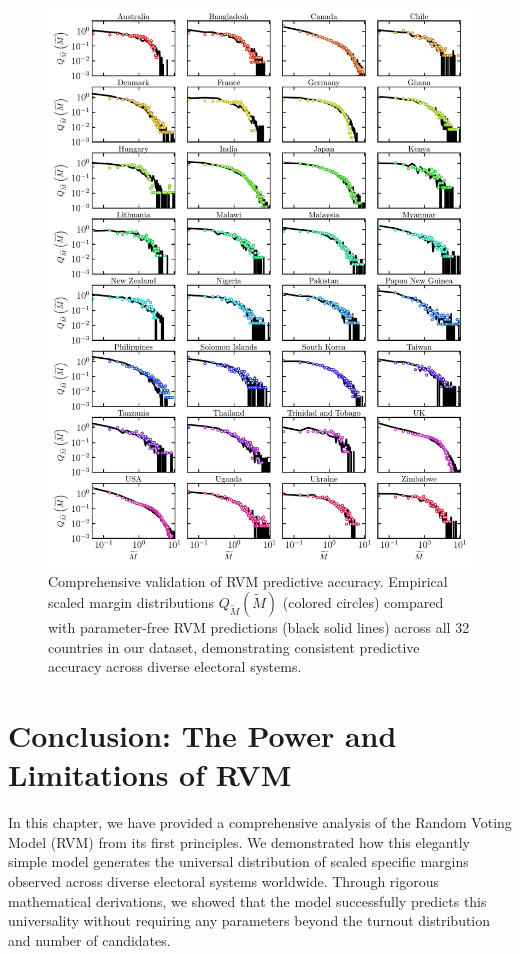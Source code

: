 \begin{figure}[H]
    \includegraphics[width=\textwidth]{chapters/chapter5/scale_margin_distribution_32_countries.pdf}
    \caption{Comprehensive validation of RVM predictive accuracy. Empirical scaled margin distributions $Q_{\widetilde{M}}(\widetilde{M})$ (colored circles) compared with parameter-free RVM predictions (black solid lines) across all 32 countries in our dataset, demonstrating consistent predictive accuracy across diverse electoral systems.}
    \label{fig:RVM_all_countries}
\end{figure}

\section{Conclusion: The Power and Limitations of RVM}

In this chapter, we have provided a comprehensive analysis of the Random Voting Model (RVM) from its first principles. We demonstrated how this elegantly simple model generates the universal distribution of scaled specific margins observed across diverse electoral systems worldwide. Through rigorous mathematical derivations, we showed that the model successfully predicts this universality without requiring any parameters beyond the turnout distribution and number of candidates.

